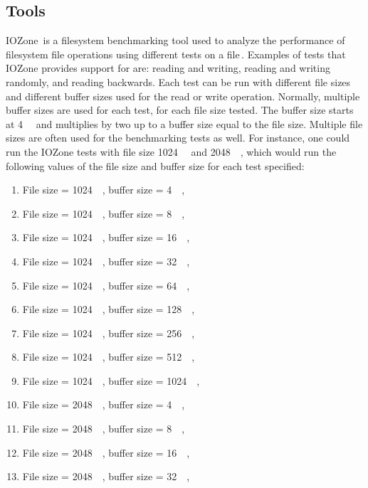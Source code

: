 \begin{enumerate}
\subsection{Tools}
IOZone\,\cite{IozoneFilesystemBenchmark} is a filesystem benchmarking tool used to analyze the performance of filesystem file operations using different tests on a file\,\cite{iozoneIozoneFilesystemBenchmark}. Examples of tests that IOZone provides support for are: reading and writing, reading and writing randomly, and reading backwards. Each test can be run with different file sizes and different buffer sizes used for the read or write operation. Normally, multiple buffer sizes are used for each test, for each file size tested. The buffer size starts at \SI{4}{\kilo\byte} and multiplies by two up to a buffer size equal to the file size. Multiple file sizes are often used for the benchmarking tests as well. For instance, one could run the IOZone tests with file size \SI{1024}{\kilo\byte} and \SI{2048}{\kilo\byte}, which would run the following values of the file size and buffer size for each test specified:
\begin{enumerate}
	\item File size = \SI{1024}{\kilo\byte}, buffer size = \SI{4}{\kilo\byte},
	\item File size = \SI{1024}{\kilo\byte}, buffer size = \SI{8}{\kilo\byte},
	\item File size = \SI{1024}{\kilo\byte}, buffer size = \SI{16}{\kilo\byte},
	\item File size = \SI{1024}{\kilo\byte}, buffer size = \SI{32}{\kilo\byte},
	\item File size = \SI{1024}{\kilo\byte}, buffer size = \SI{64}{\kilo\byte},
	\item File size = \SI{1024}{\kilo\byte}, buffer size = \SI{128}{\kilo\byte},
	\item File size = \SI{1024}{\kilo\byte}, buffer size = \SI{256}{\kilo\byte},
	\item File size = \SI{1024}{\kilo\byte}, buffer size = \SI{512}{\kilo\byte},
	\item File size = \SI{1024}{\kilo\byte}, buffer size = \SI{1024}{\kilo\byte},
	\item File size = \SI{2048}{\kilo\byte}, buffer size = \SI{4}{\kilo\byte},
	\item File size = \SI{2048}{\kilo\byte}, buffer size = \SI{8}{\kilo\byte},
	\item File size = \SI{2048}{\kilo\byte}, buffer size = \SI{16}{\kilo\byte},
	\item File size = \SI{2048}{\kilo\byte}, buffer size = \SI{32}{\kilo\byte},

\end{enumerate}
\end{enumerate}

